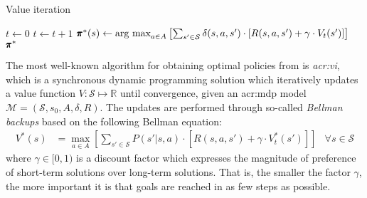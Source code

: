 \begin{algorithm}[!t]
	\caption{Value iteration}
	\label{alg:vi}
	\begin{algorithmic}[1]
		\Require{MDP $\mathcal{M} = (\mathcal{S}, s_0, A, \delta, R)$, Discount factor $\gamma \in [0, 1)$, Threshold $\xi > 0$}
		\State $t \gets 0$
		\Repeat
		\State $t \gets t + 1$
		\EndFor
		\State $\pmb{\pi}^*(s) \gets \text{arg max}_{a \in A} \left[\sum_{s' \in \mathcal{S}} \delta(s, a, s') \cdot \left[R(s, a, s') + \gamma \cdot V_{t}(s')\right]\right]$
		\EndFor
		\State\Return $\pmb{\pi}^*$
	\end{algorithmic}
\end{algorithm}

The most well-known algorithm for obtaining optimal policies from  is \textit{\acrfull{acr:vi}}, which is a synchronous dynamic programming solution which iteratively updates a value function $V: \mathcal{S} \mapsto \mathbb{R}$ until convergence, given an \acrshort{acr:mdp} model $\mathcal{M} = (\mathcal{S}, s_0, A, \delta, R)$.
The updates are performed through so-called \textit{Bellman backups} based on the following Bellman equation:
\begin{align}
V^*(s) &= \max_{a \in A} \left[\sum_{s' \in \mathcal{S}} P(s' \vert s, a) \cdot \left[R(s, a, s') + \gamma \cdot V^*_{t}(s')\right]\right]	&\forall s \in \mathcal{S}
\end{align}
where $\gamma \in [0,1)$ is a discount factor which expresses the magnitude of preference of short-term solutions over long-term solutions. That is, the smaller the factor $\gamma$, the more important it is that goals are reached in as few steps as possible.

